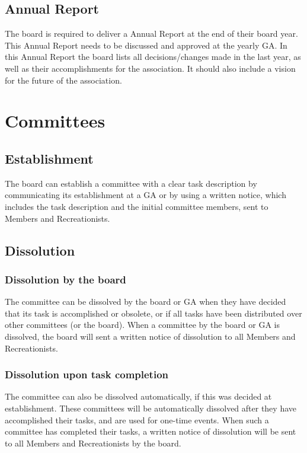 \documentclass[a4paper]{article}
\newcommand{\Ajv}{Annual Report} %
\begin{document}
\subsection{\Ajv}
The board is required to deliver a { \Ajv} at the end of their board year. This { \Ajv} needs to be discussed and approved at the yearly { GA}. In this { \Ajv} the board lists all decisions/changes made in the last year, as well as their accomplishments for the association. It should also include a vision for the future of the association.

\section{Committees}
\subsection{Establishment}
The board can establish a committee with a clear task description by communicating its establishment at a { GA} or by using a written notice, which includes the task description and the initial committee members, sent to { Members} and { Recreationists}.

\subsection{Dissolution}
\subsubsection{Dissolution by the board}
The committee can be dissolved by the board or { GA} when they have decided that its task is accomplished or obsolete, or if all tasks have been distributed over other committees (or the board). When a committee by the board or { GA} is dissolved, the board will sent a written notice of dissolution to all { Members} and { Recreationists}.

\subsubsection{Dissolution upon task completion}
The committee can also be dissolved automatically, if this was decided at establishment. These committees will be automatically dissolved after they have accomplished their tasks, and are used for one-time events. When such a committee has completed their tasks, a written notice of dissolution will be sent to all { Members} and { Recreationists} by the board.
\end{document}
